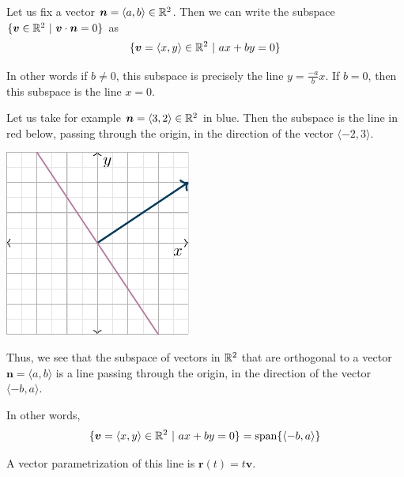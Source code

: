 \begin{example}
    Let us fix a vector $\bm{n} = \langle a, b\rangle \in \mathbb{R}^2$.  Then we can write the subspace $\{\bm{v} \in \mathbb{R}^2 \ | \ \bm{v} \cdot \bm{n} = 0\}$ as
    $$\{\bm{v} = \langle x, y \rangle \in \mathbb{R}^2 \ | \ ax+by = 0\}$$
    
    In other words if $b\neq0$, this subspace is precisely the line $y = \frac{-a}{b}x$.  If $b=0$, then this subspace is the line $x=0$.
    
    Let us take for example $\bm{n} = \langle 3, 2\rangle \in \mathbb{R}^2$ in blue. Then the subspace is the line in red below, passing through the origin, in the direction of the vector $\langle-2, 3\rangle$.
    
 \begin{center}        
        \includegraphics{chapters/1-LinearAlgebra/figures/figures-normalline.pdf}
    \end{center}
\end{example}

Thus, we see that the subspace of vectors in $\mathbb{R}^2$ that are orthogonal to a vector $\bm{n} = \langle a, b \rangle$ is a line passing through the origin, in the direction of the vector $\langle -b, a \rangle$.

In other words, 
$$\{\bm{v} = \langle x, y \rangle \in \mathbb{R}^2 \ | \ ax+by = 0\} = \textnormal{span}\{\langle -b, a \rangle\}$$

A vector parametrization of this line is $\bm{r}(t) = t\bm{v}$.



